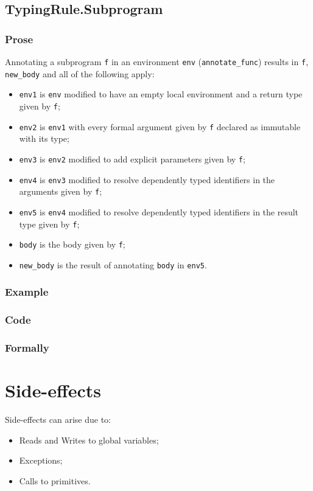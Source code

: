 \documentclass{book}
\begin{document}
\section{TypingRule.Subprogram \label{sec:TypingRule.Subprogram}}

  \subsection{Prose}
Annotating a subprogram \texttt{f} in an environment \texttt{env}
(\texttt{annotate\_func}) results in \texttt{f}, \texttt{new\_body} and all of
the following apply:
 \begin{itemize}
   \item \texttt{env1} is \texttt{env} modified to have an empty local
     environment and a return type given by \texttt{f};
   \item \texttt{env2} is \texttt{env1} with every formal argument given by
     \texttt{f} declared as immutable with its type;
   \item \texttt{env3} is \texttt{env2} modified to add explicit parameters
     given by \texttt{f};
   \item \texttt{env4} is \texttt{env3} modified to resolve dependently typed
     identifiers in the arguments given by \texttt{f};
   \item \texttt{env5} is \texttt{env4} modified to resolve dependently typed
     identifiers in the result type given by \texttt{f};
   \item \texttt{body} is the body given by \texttt{f};
   \item \texttt{new\_body} is the result of annotating \texttt{body} in
     \texttt{env5}.
 \end{itemize} 

  \subsection{Example}

  \subsection{Code}

\begin{emptyformal}
    \subsection{Formally}
\end{emptyformal}


\chapter{Side-effects}

Side-effects can arise due to:
\begin{itemize}
\item Reads and Writes to global variables;
\item Exceptions;
\item Calls to primitives.
\end{itemize}



\end{document}
